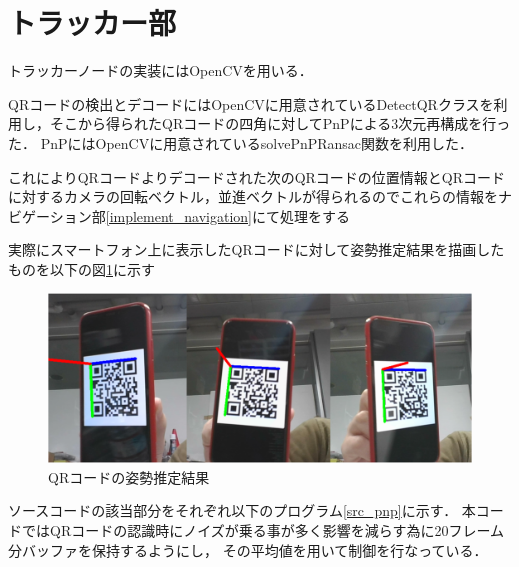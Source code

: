 \section{トラッカー部}
\label{implement_tracker}
トラッカーノードの実装にはOpenCVを用いる．

QRコードの検出とデコードにはOpenCVに用意されているDetectQRクラスを利用し，そこから得られたQRコードの四角に対してPnPによる3次元再構成を行った．
PnPにはOpenCVに用意されているsolvePnPRansac関数を利用した．

これによりQRコードよりデコードされた次のQRコードの位置情報とQRコードに対するカメラの回転ベクトル，並進ベクトルが得られるのでこれらの情報をナビゲーション部\ref{implement_navigation}にて処理をする

実際にスマートフォン上に表示したQRコードに対して姿勢推定結果を描画したものを以下の図\ref{pnp_qr_img}に示す

\begin{figure}[htbp]
  \begin{center}
    \includegraphics[clip,width=15.0cm]{img/pnp_qr.png}
    \caption{QRコードの姿勢推定結果}
    \label{pnp_qr_img}
  \end{center}
\end{figure}

ソースコードの該当部分をそれぞれ以下のプログラム\ref{src_pnp}に示す．
本コードではQRコードの認識時にノイズが乗る事が多く影響を減らす為に20フレーム分バッファを保持するようにし，
その平均値を用いて制御を行なっている．

